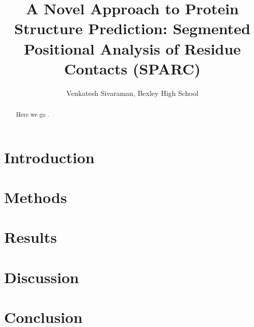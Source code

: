 \documentclass[12pt,twocolumn]{article}
\title{A Novel Approach to Protein Structure Prediction: Segmented Positional Analysis of Residue Contacts (SPARC)}
\author{Venkatesh Sivaraman, Bexley High School}
\begin{document}
\maketitle

\begin{abstract}
Here we go \cite{anfinsen}.
\end{abstract}

\section{Introduction}

\section{Methods}

\section{Results}

\section{Discussion}

\section{Conclusion}


\nocite{*}
{\footnotesize }
\end{document}
